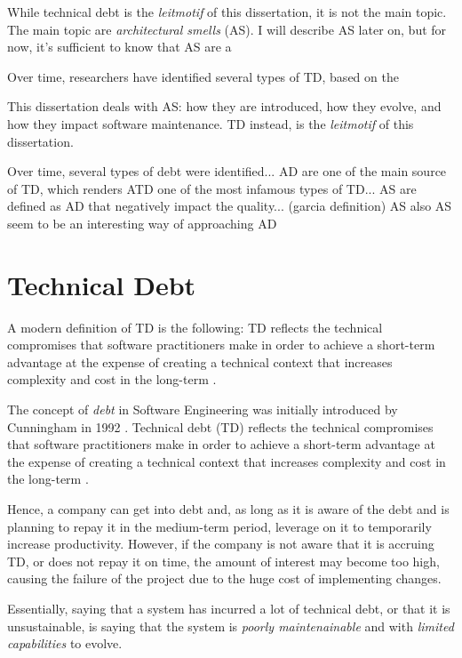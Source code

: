 While technical debt is the \emph{leitmotif} of this dissertation, it is not the main topic.
The main topic are \emph{architectural smells} (AS).  I will describe AS later on, but for now, it's sufficient to know that AS are a 


Over time, researchers have identified several types of TD, based on the 


This dissertation deals with AS: how they are introduced, how they evolve, and how they impact software maintenance.
TD instead, is the \emph{leitmotif} of this dissertation.



Over time, several types of debt were identified... 
AD are one of the main source of TD, which renders ATD one of the most infamous types of TD...
AS are defined as AD that negatively impact the quality... (garcia definition)
AS also 
AS seem to be an interesting way of approaching AD 



\section{Technical Debt}
A modern definition of TD is the following: TD reflects the technical compromises that software practitioners make in order to achieve a short-term advantage at the expense of creating a technical context that increases complexity and cost in the long-term \cite{Avgeriou2016}. 

The concept of \textit{debt} in Software Engineering was initially introduced by Cunningham in 1992 \cite{Cunningham1992}.
Technical debt (TD) reflects the technical compromises that software practitioners make in order to achieve a short-term advantage at the expense of creating a technical context that increases complexity and cost in the long-term \cite{Avgeriou2016}.  

Hence, a company can get into debt and, as long as it is aware of the debt and is planning to repay it in the medium-term period, leverage on it to temporarily increase productivity.
However, if the company is not aware that it is accruing TD, or does not repay it on time, the amount of interest may become too high, causing the failure of the project due to the huge cost of implementing changes.

Essentially, saying that a system has incurred a lot of technical debt, or that it is unsustainable, is saying that the system is \emph{poorly maintenainable} and with \emph{limited capabilities} to evolve. 

